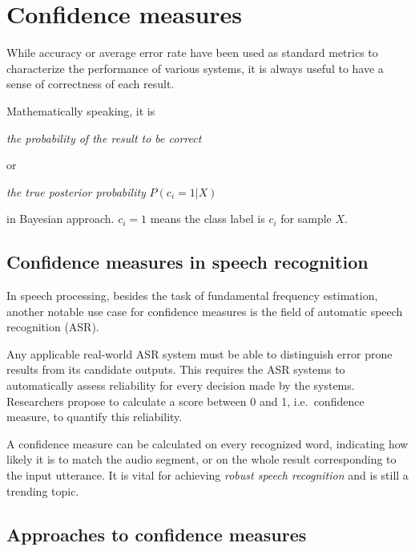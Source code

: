 \documentclass[11pt,a4paper]{report}
\begin{document}
\newpage

\section{Confidence measures}

While accuracy or average error rate have been used as standard metrics to characterize the performance of various systems, it is always useful to have a sense of correctness of each result.

\bigskip

Mathematically speaking, it is

\begin{center}
  \textit{the probability of the result to be correct}
\end{center}

or

\begin{center}
  \textit{the true posterior probability} \(P (c_i = 1 | X)\)
\end{center}

in Bayesian approach.
\(c_i = 1\) means the class label is \(c_i\) for sample \(X\).

\subsection{Confidence measures in speech recognition}

In speech processing, besides the task of fundamental frequency estimation, another notable use case for confidence measures is the field of automatic speech recognition (ASR).

Any applicable real-world ASR system must be able to distinguish error prone results from its candidate outputs.
This requires the ASR systems to automatically assess reliability for every decision made by the systems.
Researchers propose to calculate a score between 0 and 1, i.e.\, confidence measure, to quantify this reliability.

A confidence measure can be calculated on every recognized word, indicating how likely it is to match the audio segment, or on the whole result corresponding to the input utterance.
It is vital for achieving \emph{robust speech recognition} and is still a trending topic.

\subsection{Approaches to confidence measures}
\end{document}

